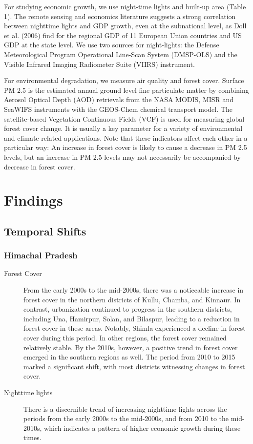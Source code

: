 \documentclass{article}
\begin{document}
For studying economic growth, we use night-time lights and built-up area (Table 1). The remote sensing and economics literature suggests a strong correlation between nighttime lights and GDP growth, even at the subnational level, as Doll et al. (2006) find for the regional GDP of 11 European Union countries and US GDP at the state level. We use two sources for night-lights: the Defense Meteorological Program Operational Line-Scan System (DMSP-OLS) and the Visible Infrared Imaging Radiometer Suite (VIIRS) instrument.

For environmental degradation, we measure air quality and forest cover. Surface PM 2.5 is the estimated annual ground level fine particulate matter by combining Aerosol Optical Depth (AOD) retrievals from the NASA MODIS, MISR and SeaWIFS instruments with the GEOS-Chem chemical transport model. The satellite-based Vegetation Continuous Fields (VCF) is used for measuring global forest cover change. It is usually a key parameter for a variety of environmental and climate related applications. Note that these indicators affect each other in a particular way: An increase in forest cover is likely to cause a decrease in PM 2.5 levels, but an increase in PM 2.5 levels may not necessarily be accompanied by decrease in forest cover.


\section{Findings}

\subsection{Temporal Shifts}

\subsubsection*{Himachal Pradesh}

\begin{description}
    \item[Forest Cover] From the early 2000s to the mid-2000s, there was a noticeable increase in forest cover in the northern districts of Kullu, Chamba, and Kinnaur. In contrast, urbanization continued to progress in the southern districts, including Una, Hamirpur, Solan, and Bilaspur, leading to a reduction in forest cover in these areas. Notably, Shimla experienced a decline in forest cover during this period. In other regions, the forest cover remained relatively stable. By the 2010s, however, a positive trend in forest cover emerged in the southern regions as well. The period from 2010 to 2015 marked a significant shift, with most districts witnessing changes in forest cover.
    \item[Nighttime lights] There is a discernible trend of increasing nighttime lights across the periods from the early 2000s to the mid-2000s, and from 2010 to the mid-2010s, which indicates a pattern of higher economic growth during these times.

\end{description}
\end{document}
